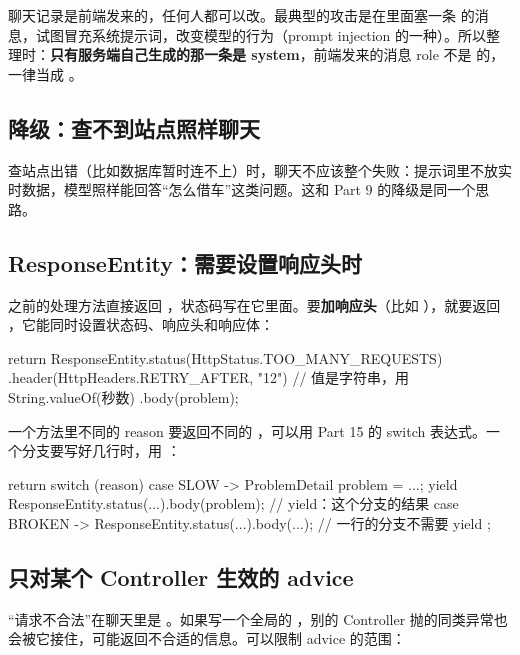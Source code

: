 聊天记录是前端发来的，任何人都可以改。最典型的攻击是在里面塞一条  的消息，试图冒充系统提示词，改变模型的行为（prompt injection 的一种）。所以整理时：\textbf{只有服务端自己生成的那一条是 system}，前端发来的消息 role 不是  的，一律当成 。

\subsection{降级：查不到站点照样聊天}

查站点出错（比如数据库暂时连不上）时，聊天不应该整个失败：提示词里不放实时数据，模型照样能回答“怎么借车”这类问题。这和 Part 9 的降级是同一个思路。

\subsection{ResponseEntity：需要设置响应头时}

之前的处理方法直接返回 ，状态码写在它里面。要\textbf{加响应头}（比如 ），就要返回 ，它能同时设置状态码、响应头和响应体：

\begin{java}
return ResponseEntity.status(HttpStatus.TOO_MANY_REQUESTS)
        .header(HttpHeaders.RETRY_AFTER, "12")     // 值是字符串，用 String.valueOf(秒数)
        .body(problem);
\end{java}

一个方法里不同的 reason 要返回不同的 ，可以用 Part 15 的 switch 表达式。一个分支要写好几行时，用 ：

\begin{java}
return switch (reason) {
    case SLOW -> {
        ProblemDetail problem = ...;
        yield ResponseEntity.status(...).body(problem);     // yield：这个分支的结果
    }
    case BROKEN -> ResponseEntity.status(...).body(...);    // 一行的分支不需要 yield
};
\end{java}

\subsection{只对某个 Controller 生效的 advice}

“请求不合法”在聊天里是 。如果写一个全局的 ，别的 Controller 抛的同类异常也会被它接住，可能返回不合适的信息。可以限制 advice 的范围：

